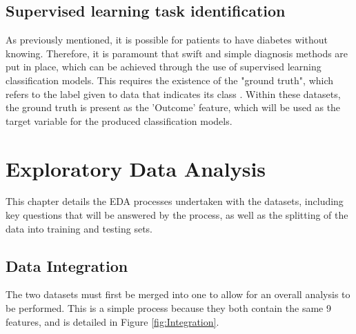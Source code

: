 \documentclass[12pt]{report}
\begin{document}
\section{Supervised learning task identification}
As previously mentioned, it is possible for patients to have diabetes without knowing. Therefore,
it is paramount that swift and simple diagnosis methods are put in place, which can be achieved 
through the use of supervised learning classification models. This requires the existence of the 
"ground truth", which refers to the label given to data that indicates its class \autocite{c3ai_what_nodate}. 
Within these datasets, the ground truth is present as the 'Outcome' feature, which will be used 
as the target variable for the produced classification models.




\chapter{Exploratory Data Analysis}
This chapter details the EDA processes undertaken with the datasets, including 
key questions that will be answered by the process, as well as the splitting of the 
data into training and testing %
sets.

\section{Data Integration}
The two datasets must first be merged into one to allow for an overall analysis to be performed.
This is a simple process because they both contain the same 9 features, and is detailed in Figure 
\ref{fig:Integration}.
\end{document}
